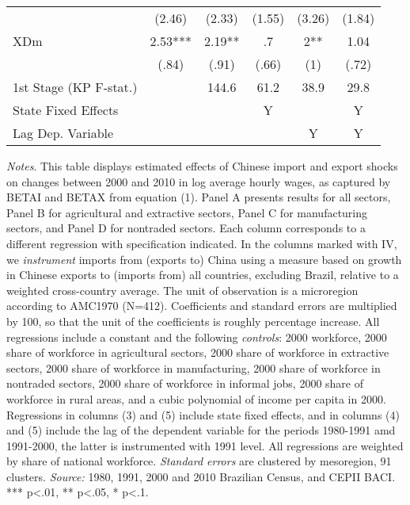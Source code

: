 \begin{center}
\begin{table}[h!]
\begin{center}
\begin{centering}
\begin{tabular}{lccccc}
 & {\scriptsize{}(2.46)} & {\scriptsize{}(2.33)} & {\scriptsize{}(1.55)} & {\scriptsize{}(3.26)} & {\scriptsize{}(1.84)}\tabularnewline
{\footnotesize{}XDm} & {\footnotesize{} 2.53***} & {\footnotesize{} 2.19**} & {\footnotesize{} .7} & {\footnotesize{} 2**} & {\footnotesize{} 1.04}\tabularnewline
 & {\scriptsize{}(.84)} & {\scriptsize{}(.91)} & {\scriptsize{}(.66)} & {\scriptsize{}(1)} & {\scriptsize{}(.72)}\tabularnewline
{\scriptsize{}1st Stage (KP F-stat.)} &  & {\scriptsize{} 144.6} & {\scriptsize{} 61.2} & {\scriptsize{} 38.9} & {\scriptsize{} 29.8}\tabularnewline
\hline 
{\scriptsize{}State Fixed Effects} &  &  & {\scriptsize{}Y} &  & {\scriptsize{}Y}\tabularnewline
{\scriptsize{}Lag Dep. Variable} &  &  &  & {\scriptsize{}Y} & {\scriptsize{}Y}\tabularnewline
\hline 
\end{tabular}
\par\end{centering}
\medskip
\end{center}
\footnotesize
\emph{Notes}. This table displays estimated effects of Chinese import and export shocks on changes between 2000 and 2010 in log average hourly wages, as captured by BETAI and BETAX from equation (1). Panel A presents results for all sectors, Panel B for agricultural and extractive sectors, Panel C for manufacturing sectors, and Panel D for nontraded sectors. Each column corresponds to a different regression with specification indicated. In the columns marked with IV, we \emph{instrument} imports from (exports to) China using a measure based on growth in Chinese exports to (imports from) all countries, excluding Brazil, relative to a weighted cross-country average. The unit of observation is a microregion according to AMC1970 (N=412). Coefficients and standard errors are multiplied by 100, so that the unit of the coefficients is roughly percentage increase. All regressions include a constant and the following \emph{controls}: 2000 workforce, 2000 share of workforce in agricultural sectors, 2000 share of workforce in extractive sectors, 2000 share of workforce in manufacturing, 2000 share of workforce in nontraded sectors, 2000 share of workforce in informal jobs, 2000 share of workforce in rural areas, and a cubic polynomial of income per capita in 2000. Regressions in columns (3) and (5) include state fixed effects, and in columns (4) and (5) include the lag of the dependent variable for the periods 1980-1991 amd 1991-2000, the latter is instrumented with 1991 level. All regressions are weighted by share of national workforce.
 \emph{Standard errors} are clustered by mesoregion, 91 clusters. \emph{Source:} 1980, 1991, 2000 and 2010 Brazilian Census, and CEPII BACI. *** p<.01, ** p<.05, * p<.1.
\end{table}
\par \end{center}

